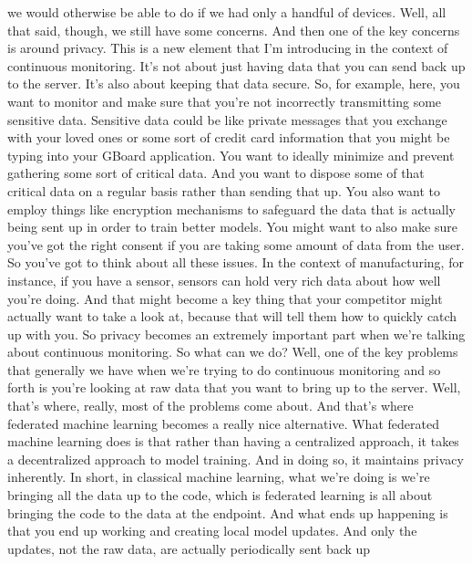 {{{{{{{{{    we would otherwise be able to do if we had only a handful of devices.
    Well, all that said, though, we still have some concerns.
    And then one of the key concerns is around privacy.
    This is a new element that I'm introducing
    in the context of continuous monitoring.
    It's not about just having data that you can send back up to the server.
    It's also about keeping that data secure.
    So, for example, here, you want to monitor and make sure
    that you're not incorrectly transmitting some sensitive data.
    Sensitive data could be like private messages
    that you exchange with your loved ones or some sort of credit card information
    that you might be typing into your GBoard application.
    You want to ideally minimize and prevent gathering some sort of critical data.
    And you want to dispose some of that critical data on a regular basis
    rather than sending that up.
    You also want to employ things like encryption mechanisms
    to safeguard the data that is actually being sent up
    in order to train better models.
    You might want to also make sure you've got the right consent if you are taking
    some amount of data from the user.
    So you've got to think about all these issues.
    In the context of manufacturing, for instance, if you have a sensor,
    sensors can hold very rich data about how well you're doing.
    And that might become a key thing that your competitor might actually
    want to take a look at, because that will tell them
    how to quickly catch up with you.
    So privacy becomes an extremely important part
    when we're talking about continuous monitoring.
    So what can we do?
    Well, one of the key problems that generally we
    have when we're trying to do continuous monitoring and so forth is you're
    looking at raw data that you want to bring up to the server.
    Well, that's where, really, most of the problems come about.
    And that's where federated machine learning
    becomes a really nice alternative.
    What federated machine learning does is that rather
    than having a centralized approach, it takes a decentralized approach
    to model training.
    And in doing so, it maintains privacy inherently.
    In short, in classical machine learning, what we're doing is
    we're bringing all the data up to the code,
    which is federated learning is all about bringing
    the code to the data at the endpoint.
    And what ends up happening is that you end up working and creating
    local model updates.
    And only the updates, not the raw data, are actually periodically sent back up
}}}}}}}}}
